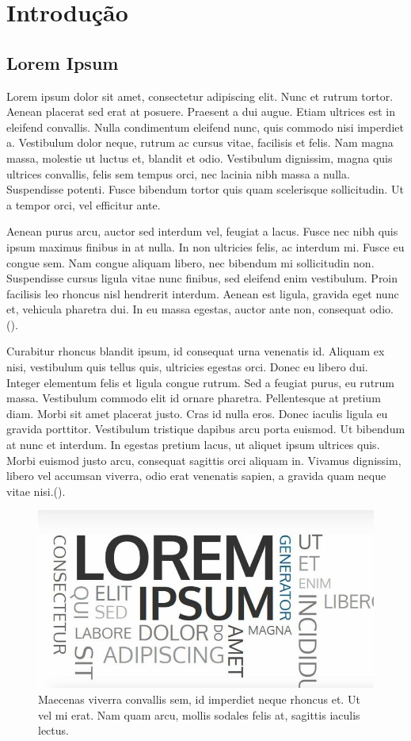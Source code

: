 \chapter{Introdução}

\section{Lorem Ipsum}

Lorem ipsum dolor sit amet, consectetur adipiscing elit. Nunc et rutrum tortor. Aenean placerat sed erat at posuere. Praesent a dui augue. Etiam ultrices est in eleifend convallis. Nulla condimentum eleifend nunc, quis commodo nisi imperdiet a. Vestibulum dolor neque, rutrum ac cursus vitae, facilisis et felis. Nam magna massa, molestie ut luctus et, blandit et odio. Vestibulum dignissim, magna quis ultrices convallis, felis sem tempus orci, nec lacinia nibh massa a nulla. Suspendisse potenti. Fusce bibendum tortor quis quam scelerisque sollicitudin. Ut a tempor orci, vel efficitur ante.

Aenean purus arcu, auctor sed interdum vel, feugiat a lacus. Fusce nec nibh quis ipsum maximus finibus in at nulla. In non ultricies felis, ac interdum mi. Fusce eu congue sem. Nam congue aliquam libero, nec bibendum mi sollicitudin non. Suspendisse cursus ligula vitae nunc finibus, sed eleifend enim vestibulum. Proin facilisis leo rhoncus nisl hendrerit interdum. Aenean est ligula, gravida eget nunc et, vehicula pharetra dui. In eu massa egestas, auctor ante non, consequat odio. (\cite{alvim2007}).

Curabitur rhoncus blandit ipsum, id consequat urna venenatis id. Aliquam ex nisi, vestibulum quis tellus quis, ultricies egestas orci. Donec eu libero dui. Integer elementum felis et ligula congue rutrum. Sed a feugiat purus, eu rutrum massa. Vestibulum commodo elit id ornare pharetra. Pellentesque at pretium diam. Morbi sit amet placerat justo. Cras id nulla eros. Donec iaculis ligula eu gravida porttitor. Vestibulum tristique dapibus arcu porta euismod. Ut bibendum at nunc et interdum. In egestas pretium lacus, ut aliquet ipsum ultrices quis. Morbi euismod justo arcu, consequat sagittis orci aliquam in. Vivamus dignissim, libero vel accumsan viverra, odio erat venenatis sapien, a gravida quam neque vitae nisi.(\cite{mme2020}). 

\begin{figure}[H]
    \centering
    \includegraphics[width=0.5\linewidth]{Imagens/chap01/loren-ipsum-cover.jpg}
    \caption{Maecenas viverra convallis sem, id imperdiet neque rhoncus et. Ut vel mi erat. Nam quam arcu, mollis sodales felis at, sagittis iaculis lectus.}
    \label{fig:lorem_ipsum}
\end{figure}

